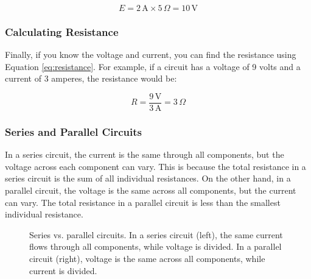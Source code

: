 \[
E = 2\,\text{A} \times 5\,\Omega = 10\,\text{V}
\]

\subsubsection*{Calculating Resistance}
Finally, if you know the voltage and current, you can find the resistance using Equation \ref{eq:resistance}. For example, if a circuit has a voltage of 9 volts and a current of 3 amperes, the resistance would be:

\[
R = \frac{9\,\text{V}}{3\,\text{A}} = 3\,\Omega
\]

\subsubsection*{Series and Parallel Circuits}
In a series circuit, the current is the same through all components, but the voltage across each component can vary. This is because the total resistance in a series circuit is the sum of all individual resistances. On the other hand, in a parallel circuit, the voltage is the same across all components, but the current can vary. The total resistance in a parallel circuit is less than the smallest individual resistance.


\begin{figure}[h!]
    \centering
    \caption{Series vs. parallel circuits. In a series circuit (left), the same current flows through all components, while voltage is divided. In a parallel circuit (right), voltage is the same across all components, while current is divided.}
    \label{fig:series-parallel}
\end{figure}


